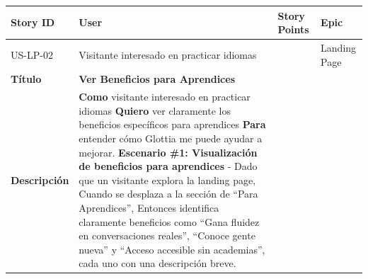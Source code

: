 {\def\LTcaptype{none} %
\begin{longtable}[]{@{}
  >{\raggedright\arraybackslash}p{}
  >{\raggedright\arraybackslash}p{}
  >{\raggedright\arraybackslash}p{}
  >{\raggedright\arraybackslash}p{}@{}}
\toprule\noalign{}
\begin{minipage}[b]{\linewidth}\raggedright
Story ID
\end{minipage} & \begin{minipage}[b]{\linewidth}\raggedright
User
\end{minipage} & \begin{minipage}[b]{\linewidth}\raggedright
Story Points
\end{minipage} & \begin{minipage}[b]{\linewidth}\raggedright
Epic
\end{minipage} \\
\midrule\noalign{}
\endhead
\bottomrule\noalign{}
\endlastfoot
US-LP-02 & Visitante interesado en practicar idiomas & 2 & Landing
Page \\
\textbf{Título} & \textbf{Ver Beneficios para Aprendices} & & \\
\textbf{Descripción} & \textbf{Como} visitante interesado en practicar
idiomas \textbf{Quiero} ver claramente los beneficios específicos para
aprendices \textbf{Para} entender cómo Glottia me puede ayudar a
mejorar. \textbf{Escenario \#1: Visualización de beneficios para
aprendices} - Dado que un visitante explora la landing page, Cuando se
desplaza a la sección de ``Para Aprendices'', Entonces identifica
claramente beneficios como ``Gana fluidez en conversaciones reales'',
``Conoce gente nueva'' y ``Acceso accesible sin academias'', cada uno
con una descripción breve. & & \\
\end{longtable}
}

